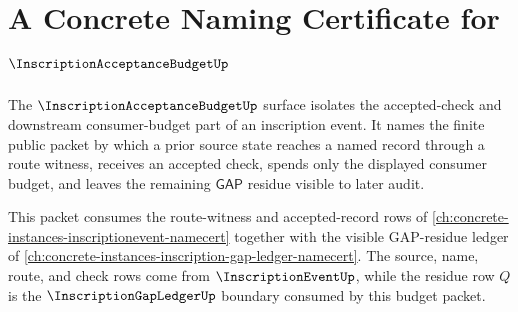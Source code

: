 \chapter{A Concrete Naming Certificate for $\InscriptionAcceptanceBudgetUp$}
\label{ch:concrete-instances-inscription-acceptance-budget-namecert}

The $\InscriptionAcceptanceBudgetUp$ surface isolates the accepted-check and downstream consumer-budget part of an inscription event. It names the finite public packet by which a prior source state reaches a named record through a route witness, receives an accepted check, spends only the displayed consumer budget, and leaves the remaining $\mathsf{GAP}$ residue visible to later audit.

This packet consumes the route-witness and accepted-record rows of \autoref{ch:concrete-instances-inscriptionevent-namecert} together with the visible GAP-residue ledger of \autoref{ch:concrete-instances-inscription-gap-ledger-namecert}. The source, name, route, and check rows come from $\InscriptionEventUp$, while the residue row $Q$ is the $\InscriptionGapLedgerUp$ boundary consumed by this budget packet.

